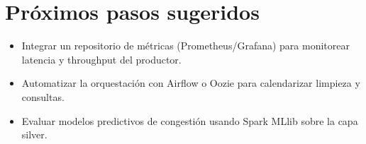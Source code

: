 \documentclass[11pt]{article}
\begin{document}
\section{Próximos pasos sugeridos}
\begin{itemize}[leftmargin=*]
  \item Integrar un repositorio de métricas (Prometheus/Grafana) para monitorear latencia y throughput del productor.
  \item Automatizar la orquestación con Airflow o Oozie para calendarizar limpieza y consultas.
  \item Evaluar modelos predictivos de congestión usando Spark MLlib sobre la capa silver.
\end{itemize}
\end{document}
